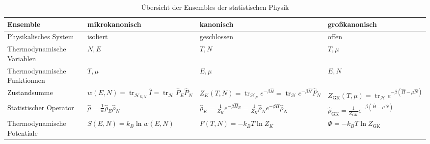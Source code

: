 \documentclass[11pt]{article}
\theoremstyle{plain}
\theoremstyle{mytheoremstyle}
\newcommand{\trace}{\operatorname{tr}}
\begin{document}
\begin{table}[htpb]
  \centering
  \begin{tabular}{p{4.5cm}|p{3cm}|p{3cm}|p{3cm}}
    Ensemble & mikrokanonisch & kanonisch & gro\ss{}kanonisch \\
    \hline 
    Physikalisches System & isoliert & geschlossen & offen \\
    \hline 
    Thermodynamische Variablen & $N, E$ & $T,N$ & $T, \mu$ \\
    \hline 
    Thermodynamische Funktionnen & $T, \mu$ & $E, \mu$ & $E, N$ \\ 
    \hline 
    Zustandsumme & $w(E, N) = \trace_{\mathcal{H}_{E,N}} \hat{I} = 
    \trace_{\mathcal{H}} \hat{P}_E \hat{P}_N$ & $Z_K (T, N) = 
    \trace_{\mathcal{H}_N} e ^{-\beta \hat{H}} = 
    \trace_{\mathcal{H}} e^{-\beta \hat{H}} \hat{P}_N$ & 
    $Z_{\text{GK}}(T, \mu) = \trace_{\mathcal{H}} e^{-\beta(\hat{H} -\mu \hat{N})}$ \\
    \hline 
    Statistischer Operator & 
    $ \hat{\rho} = \frac{1}{w} \hat{\rho}_E \hat{\rho}_N$ & 
    $\hat{\rho}_K = \frac{1}{Z_K} e^{-\beta \hat{H}_N}
    = \frac{1}{Z_K} \hat{\rho}_N e ^{-\beta H} \hat{\rho}_N$ & 
    $\hat{\rho}_{\text{GK}} = \frac{1}{Z_{\text{GK}}} e^{-\beta (\hat{H} - \mu \hat{N})}$ \\
    \hline 
    Thermodynamische Potentiale & $S(E, N) = k_B \ln{ w (E, N)}$ & 
    $F(T, N) = -k_B T \ln{Z_K}$ & $\Phi = -k_B T \ln{Z_{\text{GK}}}$ \\
    \hline 
  \end{tabular}
  \caption{\"Ubersicht der Ensembles der statistischen Physik}
\end{table}
%
\end{document}
